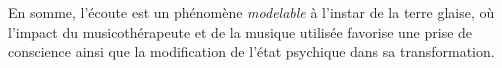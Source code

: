 











        

  

En somme, l'écoute est un phénomène \textit{modelable} à l'instar de
la terre glaise, où l'impact du musicothérapeute et de la musique utilisée favorise une prise de
conscience ainsi que la modification
de  l'état psychique dans sa transformation.


